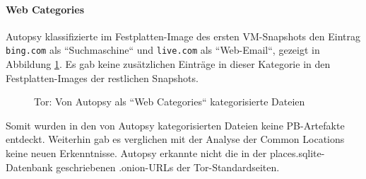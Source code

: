 \begin{appendices}
\paragraph*{Web Categories}
Autopsy klassifizierte im Festplatten-Image des ersten VM-Snapshots den Eintrag \texttt{bing.com} als ``Suchmaschine``  und \texttt{live.com} als ``Web-Email``, gezeigt in Abbildung \ref{img:tor-web-categories}.
Es gab keine zusätzlichen Einträge in dieser Kategorie in den Festplatten-Images der restlichen Snapshots.
\begin{figure}[h!]
	\centerline{} 
	\caption{Tor: Von Autopsy als ``Web Categories`` kategorisierte Dateien}
	\label{img:tor-web-categories} 
\end{figure}
		
Somit wurden in den von Autopsy kategorisierten Dateien keine PB-Artefakte entdeckt. Weiterhin gab es verglichen mit der Analyse der Common Locations keine neuen Erkenntnisse. Autopsy erkannte nicht die in der places.sqlite-Datenbank geschriebenen .onion-URLs der Tor-Standardseiten.



\end{appendices}
